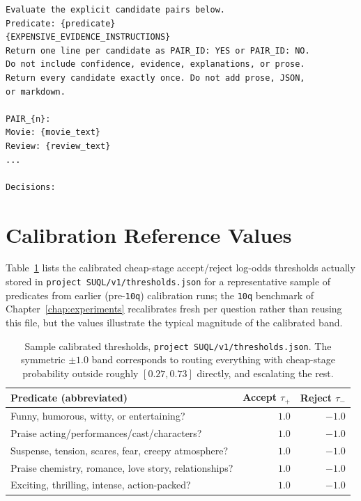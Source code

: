 \begin{lstlisting}[style=prompt, caption={Trummer~V1 expensive Stage~2 batched verification prompt (\texttt{cascade.py}, \texttt{\_expensive\_batch\_prompt}).}]
Evaluate the explicit candidate pairs below.
Predicate: {predicate}
{EXPENSIVE_EVIDENCE_INSTRUCTIONS}
Return one line per candidate as PAIR_ID: YES or PAIR_ID: NO.
Do not include confidence, evidence, explanations, or prose.
Return every candidate exactly once. Do not add prose, JSON,
or markdown.

PAIR_{n}:
Movie: {movie_text}
Review: {review_text}
...

Decisions:
\end{lstlisting}

\section{Calibration Reference Values}
\label{sec:appendix-calibration}

Table~\ref{tab:appendix-thresholds} lists the calibrated cheap-stage
accept/reject log-odds thresholds actually stored in
\texttt{project SUQL/v1/thresholds.json} for a representative sample of
predicates from earlier (pre-\texttt{10q}) calibration runs; the
\texttt{10q} benchmark of Chapter~\ref{chap:experiments} recalibrates
fresh per question rather than reusing this file, but the values
illustrate the typical magnitude of the calibrated band.

\begin{table}[h]
\centering\small
\begin{tabular}{p{9.5cm}rr}
\toprule
Predicate (abbreviated) & Accept $\tau_+$ & Reject $\tau_-$ \\
\midrule
Funny, humorous, witty, or entertaining? & $1.0$ & $-1.0$ \\
Praise acting/performances/cast/characters? & $1.0$ & $-1.0$ \\
Suspense, tension, scares, fear, creepy atmosphere? & $1.0$ & $-1.0$ \\
Praise chemistry, romance, love story, relationships? & $1.0$ & $-1.0$ \\
Exciting, thrilling, intense, action-packed? & $1.0$ & $-1.0$ \\
\bottomrule
\end{tabular}
\caption{Sample calibrated thresholds, \texttt{project SUQL/v1/thresholds.json}.
The symmetric $\pm 1.0$ band corresponds to routing everything with
cheap-stage probability outside roughly $[0.27, 0.73]$ directly, and
escalating the rest.}
\label{tab:appendix-thresholds}
\end{table}

